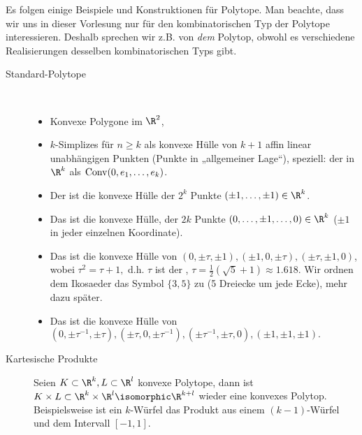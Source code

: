\begin{ex}
    Es folgen einige Beispiele und Konstruktionen für Polytope.
    Man beachte, dass wir uns in dieser Vorlesung nur für den kombinatorischen Typ der Polytope interessieren.
    Deshalb sprechen wir z.B. von \emph{dem} Polytop, obwohl es verschiedene Realisierungen desselben kombinatorischen Typs gibt.
    \begin{description}
        \item[Standard-Polytope]~
            \begin{itemize}
                \item
                    Konvexe Polygone im $\R^2$,
                \item
                    $k$-Simplizes für $n \ge k$ als konvexe Hülle von $k + 1$ affin linear unabhängigen Punkten (Punkte in „allgemeiner Lage“), speziell: der  in $\R^k$ als $\operatorname { Conv }(0,e_1,\dotsc, e_k)$.
                \item
                    Der  ist die konvexe Hülle der $2^k$ Punkte $(\pm 1, \dotsc, \pm 1) \in \R^k$.
                \item
                    Das  ist die konvexe Hülle, der $2k$ Punkte $(0, \dotsc, \pm 1, \dotsc, 0) \in \R^k$ ($\pm 1$ in jeder einzelnen Koordinate).
                \item
                    Das  ist die konvexe Hülle von $(0,\pm \tau, \pm 1), (\pm 1, 0, \pm \tau), (\pm \tau, \pm 1, 0)$, wobei
                    \begin{math}
                        \tau^2 = \tau + 1,
                    \end{math}
                    d.h. $\tau$ ist der , $\tau = \frac{1}{2}(\sqrt 5 + 1) \approx 1.618$.
                    Wir ordnen dem Ikosaeder das Symbol $\{3,5\}$ zu (5 Dreiecke um jede Ecke), mehr dazu später.
                \item
                    Das  ist die konvexe Hülle von
                    \begin{math}
                        (0, \pm \tau^{-1}, \pm \tau),
                        (\pm \tau, 0, \pm \tau^{-1}),
                        (\pm \tau^{-1}, \pm \tau, 0),
                        (\pm 1, \pm 1, \pm 1).
                    \end{math}
            \end{itemize}
        \item[Kartesische Produkte]
            Seien $K \subset \R^k, L \subset \R^l$ konvexe Polytope, dann ist
            \begin{math}
                K \times L \subset \R^k \times \R^l \isomorphic \R^{k+l}
            \end{math}
            wieder eine konvexes Polytop.
            Beispielsweise ist ein $k$-Würfel das Produkt aus einem $(k-1)$-Würfel und dem Intervall $[-1,1]$.


\end{description}
\end{ex}
